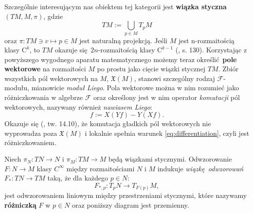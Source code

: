 Szczególnie interesującym nas obiektem tej kategorii jest \textbf{wiązka styczna} \((TM, M, \pi)\), gdzie 
\begin{equation*}
TM := \bigcup\limits_{p\in M} T_p M
\end{equation*}
oraz \(\pi: TM \ni v \mapsto p\in M\) jest naturalną projekcją. 
Jeśli \(M\) jest n-rozmaitością klasy \(\mathrm{C}^k\), to \(TM\) okazuje się \(2n\)-rozmaitością klasy \(\mathrm{C}^{k-1}\) (\cite{tu}, s. 130). 
Korzystając z powyższego wygodnego aparatu matematycznego możemy teraz określić \textbf{pole wektorowe} na rozmaitości \(M\) po prostu jako cięcie wiązki stycznej \(TM\). Zbiór wszystkich pól wektorowych na \(M\), \(\mathfrak{X}(M)\), stanowi szczególny rodzaj \(\mathcal{F}\)-modułu, mianowicie \emph{moduł Liego}. Pola wektorowe można w nim rozumieć jako różniczkowania w algebrze \(\mathcal{F}\) oraz określony jest w nim operator \emph{komutacji} pól wektorowych, nazywany również \emph{nawiasem Liego}:
\begin{equation*}
    [X, Y]f := X(Yf) - Y(Xf).
\end{equation*}
Okazuje się (\cite{tu}, tw. 14.10), że komutacja gładkich pól wektorowych nie wyprowadza poza \(\mathfrak{X}(M)\) i lokalnie spełnia warunek \eqref{eq:differentiation}, czyli jest różniczkowaniem.

Niech \(\pi_N: TN \to N\) i \(\pi_M: TM \to M\) będą wiązkami stycznymi. Odwzorowanie \(F:N\to M\) klasy \(C^\infty\) między rozmaitościami \(N\) i \(M\) indukuje \emph{wiązkę odwzorowań} \(F_\ast: TN\to TM\) taką, że dla każdego \(p\in N\):  
\begin{equation*}
F_{\ast, p}:T_p N\rightarrow T_{F(p)}M, 
\end{equation*}
jest odwzorowaniem liniowym między przestrzeniami stycznymi, które nazywamy \textbf{różniczką} \(F\) w \(p\in N\) oraz poniższy diagram jest przemienny. 
\begin{figure}[!h]
\centering
{}
\end{figure}

